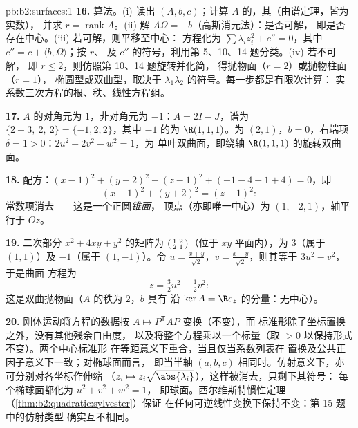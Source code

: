 \begin{solution}{pb:b2:surfaces:1}
\textbf{16.} 算法。(i) 读出 $(A, b, c)$；计算
$A$ 的，其（由谱定理，皆为实数），
并求 $r = \operatorname{rank}A$。(ii)
解 $A\Omega = -b$（高斯消元法）：是否可解，
即是否存在中心。(iii) 若可解，则平移至中心：
方程化为 $\sum\lambda_iz_i^2 + c'' = 0$，其中 $c''
= c + \langle b, \Omega\rangle$；按 $r$、
及 $c''$ 的符号，利用第 5、10、14 题分类。(iv) 若不可解，
即 $r \leq 2$，则仿照第 10、14 题旋转并化简，
得抛物面（$r = 2$）或抛物柱面（$r = 1$），
椭圆型或双曲型，取决于
$\lambda_1\lambda_2$ 的符号。每一步都是有限次计算：
实系数三次方程的根、秩、线性方程组。

\textbf{17.} $A$ 的对角元为 $1$，非对角元为 $-1$：$A = 2I
- J$，谱为 $\{2 - 3,\ 2,\ 2\} = \{-1, 2, 2\}$，其中 $-1$
的为 $\R(1,1,1)$。为 $(2,1)$，$b = 0$，右端项
$\delta = 1 > 0$：$2u^2 + 2v^2 - w^2 = 1$，为
单叶双曲面，即绕轴 $\R(1,1,1)$ 的旋转双曲面。

\textbf{18.} 配方：$(x-1)^2 + (y+2)^2 - (z-1)^2 +
(-1 - 4 + 1 + 4) = 0$，即
\[
(x-1)^2 + (y+2)^2 = (z-1)^2 :
\]
常数项消去——这是一个正圆\emph{锥面}，
顶点（亦即唯一中心）为 $(1, -2, 1)$，轴平行于
$Oz$。

\textbf{19.} 二次部分 $x^2 + 4xy + y^2$ 的矩阵为
$\begin{psmallmatrix}1 & 2\\ 2 & 1\end{psmallmatrix}$（位于
$xy$ 平面内），为 $3$（属于 $(1,1)$）及 $-1$（属于
$(1,-1)$）。令 $u = \frac{x+y}{\sqrt2}$，$v =
\frac{x-y}{\sqrt2}$，则其等于 $3u^2 - v^2$，于是曲面
方程为
\[
z = \tfrac32u^2 - \tfrac12v^2 :
\]
这是双曲抛物面（$A$ 的秩为 $2$，$b$ 具有
沿 $\ker A = \R e_z$ 的分量：无中心）。

\textbf{20.} 刚体运动将方程的数据按
$A \mapsto P^{\mathsf T}\!AP$ 变换（不变），而
标准形除了坐标置换之外，没有其他残余自由度，
以及将整个方程乘以一个标量（取
$> 0$ 以保持形式不变）。两个中心标准形
在等距意义下重合，当且仅当系数列表在
置换及公共正因子意义下一致；对椭球面而言，
即当半轴 $(a, b, c)$ 相同时。仿射意义下，亦可分别对各坐标作伸缩
（$z_i \mapsto z_i\sqrt{\abs
{\lambda_i}}$），这样被消去，只剩下其符号：
每个椭球面都化为 $u^2 + v^2 + w^2 = 1$，
即球面。西尔维斯特惯性定理
（\cref{thm:b2:quadratic:sylvester}）保证
在任何可逆线性变换下保持不变：第 15 题中的仿射类型
确实互不相同。


\end{solution}
